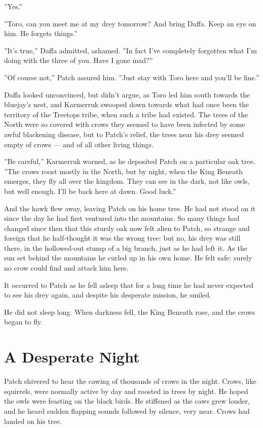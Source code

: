 \documentclass[12pt]{book}
\begin{document}
''Yes.''

''Toro, can you meet me at my drey tomorrow? And bring Daffa. Keep an
eye on him. He forgets things.''

''It's true,'' Daffa admitted, ashamed. ''In fact I've completely
forgotten what I'm doing with the three of you. Have I gone mad?''

''Of course not,'' Patch assured him. ''Just stay with Toro here and
you'll be fine.''

Daffa looked unconvinced, but didn't argue, as Toro led him south
towards the bluejay's nest, and Karmerruk swooped down towards what
had once been the territory of the Treetops tribe, when such a tribe
had existed. The trees of the North were so covered with crows they
seemed to have been infected by some awful blackening disease, but to
Patch's relief, the trees near his drey seemed empty of crows --- and
of all other living things.

''Be careful,'' Karmerruk warned, as he deposited Patch on a
particular oak tree. ''The crows roost mostly in the North, but by
night, when the King Beneath emerges, they fly all over the
kingdom. They can see in the dark, not like owls, but well
enough. I'll be back here at dawn. Good luck.''

And the hawk flew away, leaving Patch on his home tree. He had not
stood on it since the day he had first ventured into the mountains. So
many things had changed since then that this sturdy oak now felt alien
to Patch, so strange and foreign that he half-thought it was the wrong
tree: but no, his drey was still there, in the hollowed-out stump of a
big branch, just as he had left it. As the sun set behind the
mountains he curled up in his own home. He felt safe: surely no crow
could find and attack him here.

It occurred to Patch as he fell asleep that for a long time he had
never expected to see his drey again, and despite his desperate
mission, he smiled.

He did not sleep long. When darkness fell, the King Beneath rose, and
the crows began to fly.


\section{A Desperate Night}

Patch shivered to hear the cawing of thousands of crows in the
night. Crows, like squirrels, were normally active by day and roosted
in trees by night. He hoped the owls were feasting on the black
birds. He stiffened as the caws grew louder, and he heard sudden
flapping sounds followed by silence, very near. Crows had landed on
his tree.
\end{document}
